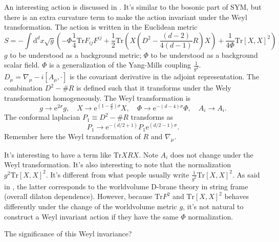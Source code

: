 An interesting action is discussed in .
It's similar to the bosonic part of SYM,
but there is an extra curvature term to make the action invariant under the Weyl transformation.
The action is written in the Euclidean metric
\begin{equation}
	S = -\int \mathrm{d}^d x \sqrt{g}
	\left( -\Phi \frac{1}{4} \mathrm{Tr}F_{ij}F^{ij}
	+ \frac{1}{2}\mathrm{Tr}\left( X (D^2 - \frac{(d-2)}{4(d-1)}R)X \right)  
+ \frac{1}{4\Phi}\mathrm{Tr}[X,X]^2\right) 
\end{equation}
$g$ to be understood as a background metric;
$\Phi$ to be understood as a background scalar field.
$\Phi$ is a generalization of the Yang-Mills coupling $\frac{1}{g^2}$.
$D_\mu = \nabla_\mu - i [A_\mu,\cdot]$ is the covariant derivative in the adjoint representation.
The combination $D^2 - \# R$ is defined such that it transforms under the Wely transformation homogeneously.
The Weyl transformation is
\[
	g \to \mathrm{e}^{2\sigma} g,\quad X\to \mathrm{e}^{(1-\frac{d}{2})\sigma}X,\quad \Phi \to \mathrm{e}^{-(d-4)\sigma}\Phi,\quad A_i\to A_i
.\] 
The conformal laplacian $P_1 \equiv D^2 - \# R$ transforms as
\[
	P_1 \to \mathrm{e}^{-(d / 2 + 1)} P_1 \mathrm{e}^{(d / 2 - 1)\sigma}
.\] 
Remember here the Weyl transformation of $R$ and $\nabla_\mu$.

It's interesting to have a term like $\mathrm{Tr}XRX$.
Note $A_i$ does not change under the Weyl transformation.
It's also interesting to note that the normalization $g^2 \mathrm{Tr}[X,X]^2$.
It's different from what people usually write $\frac{1}{g^2} \mathrm{Tr}[X,X]^2$.
As said in , the latter corresponds to the worldvolume D-brane theory in string frame (overall dilaton dependence).
However, because $\mathrm{Tr}F^2$ and $\mathrm{Tr}[X,X]^2$ behaves differently under the change of the worldvolume metric $g$,
it's not natural to construct a Weyl invariant action if they have the same $\Phi$ normalization.

The significance of this Weyl invariance?
